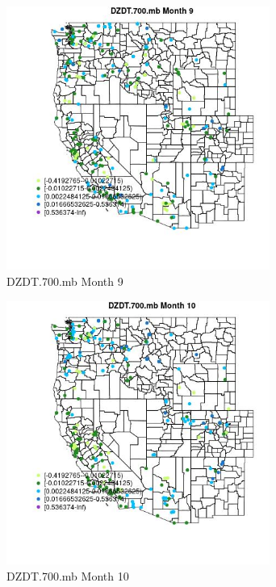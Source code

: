 \begin{figure} 
\centering  
\includegraphics[width=0.77\textwidth]{Code_Outputs/Report_ML_input_PM25_Step4_part_e_de_duplicated_aveswNAs_MapObsMo9DZDT700mb.jpg} 
\caption{\label{fig:Report_ML_input_PM25_Step4_part_e_de_duplicated_aveswNAsMapObsMo9DZDT700mb}DZDT.700.mb Month 9} 
\end{figure} 
 

\clearpage 

\begin{figure} 
\centering  
\includegraphics[width=0.77\textwidth]{Code_Outputs/Report_ML_input_PM25_Step4_part_e_de_duplicated_aveswNAs_MapObsMo10DZDT700mb.jpg} 
\caption{\label{fig:Report_ML_input_PM25_Step4_part_e_de_duplicated_aveswNAsMapObsMo10DZDT700mb}DZDT.700.mb Month 10} 
\end{figure} 
 

